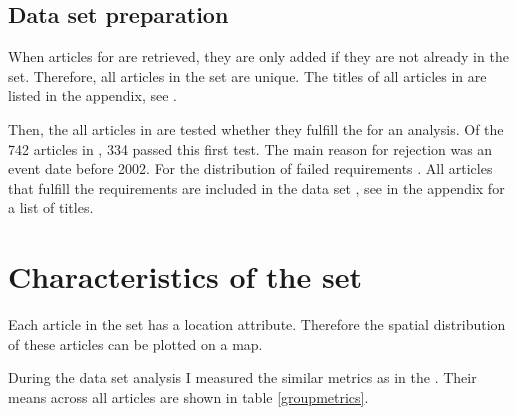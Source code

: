 \subsection{Data set preparation}\label{sub:setpreparation}

When articles for  are retrieved, they are only added if they are not already in the set. 
Therefore, all articles in the set are unique.
The titles of all articles in  are listed in the appendix, see .

Then, the all articles in  are tested whether they fulfill the  for an analysis.
Of the 742 articles in , 334 passed this first test.
The main reason for rejection was an event date before 2002. 
For the distribution of failed requirements .
All articles that fulfill the requirements are included in the data set , see  in the appendix for a list of titles.



%

\section{Characteristics of the set}\label{sec:characteristics}

Each article in the set has a location attribute. 
Therefore the spatial distribution of these articles can be plotted on a map.


During the data set analysis I measured the similar metrics as in the .
Their means across all articles are shown in table \ref{groupmetrics}.

